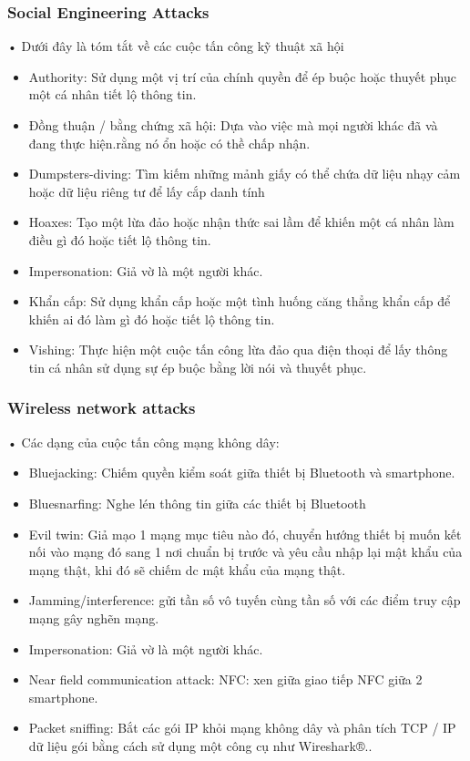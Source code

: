 \documentclass{beamer}
\begin{document}

\begin{frame}
\frametitle{Social Engineering Attacks}
  •	Dưới đây là tóm tắt về các cuộc tấn công kỹ thuật xã hội
     \begin{itemize}
    \item Authority: Sử dụng một vị trí của chính quyền để ép buộc hoặc thuyết phục một cá nhân tiết lộ thông tin.
    \item Đồng thuận / bằng chứng xã hội: Dựa vào việc mà mọi người khác đã và đang thực hiện.rằng nó ổn hoặc có thề chấp nhận.
    \item Dumpsters-diving: Tìm kiếm những mảnh giấy có thể chứa dữ liệu nhạy cảm hoặc dữ liệu riêng tư để lấy cắp danh tính
    \item Hoaxes: Tạo một lừa đảo hoặc nhận thức sai lầm để khiến một cá nhân làm điều gì đó hoặc tiết lộ thông tin.
    \item Impersonation: Giả vờ là một người khác.
    \item Khẩn cấp: Sử dụng khẩn cấp hoặc một tình huống căng thẳng khẩn cấp để khiến ai đó làm gì đó hoặc tiết lộ thông tin.
    \item Vishing: Thực hiện một cuộc tấn công lừa đảo qua điện thoại để lấy thông tin cá nhân sử dụng sự ép buộc bằng lời nói và thuyết phục.
\end{itemize}
\end{frame}


\begin{frame}
\frametitle{Wireless network attacks }
  •	Các dạng của cuộc tấn công mạng không dây:
     \begin{itemize}
    \item Bluejacking: Chiếm quyền kiểm soát giữa thiết bị Bluetooth và smartphone.
    \item Bluesnarfing: Nghe lén thông tin giữa các thiết bị Bluetooth
    \item Evil twin: Giả mạo 1 mạng mục tiêu nào đó, chuyển hướng thiết bị muốn kết nối vào mạng đó sang 1 nơi chuẩn bị trước và yêu cầu nhập lại mật khẩu của mạng thật, khi đó sẽ chiếm dc mật khẩu của mạng thật.
    \item Jamming/interference: gửi tần số vô tuyến cùng tần số với các điểm truy cập mạng gây nghẽn mạng.
    \item Impersonation: Giả vờ là một người khác.
    \item Near field communication attack: NFC: xen giữa giao tiếp NFC giữa 2 smartphone.
    \item Packet sniffing: Bắt các gói IP khỏi mạng không dây và phân tích TCP / IP dữ liệu gói bằng cách sử dụng một công cụ như Wireshark®..
\end{itemize}
\end{frame}
\end{document}

